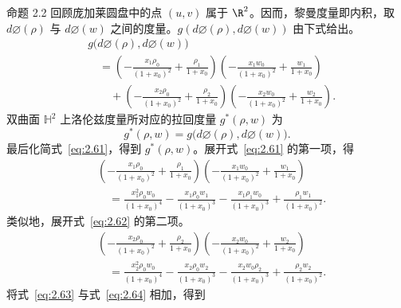 \begin{statement}{命题 2.2}{}
回顾庞加莱圆盘中的点 $(u,v)$ 属于 $\R^2$。因而，黎曼度量即内积，取 $d\varnothing(\rho)$ 与 $d\varnothing(w)$ 之间的度量。$g(d\varnothing(\rho),d\varnothing(w))$ 由下式给出。
\begin{equation*}
  \begin{aligned}
    &g\bigl(d\varnothing(\rho),d\varnothing(w)\bigr)\\
    &\quad=\left(-\frac{x_1\rho_0}{(1+x_0)^2}+\frac{\rho_1}{1+x_0}\right)
      \left(-\frac{x_1w_0}{(1+x_0)^2}+\frac{w_1}{1+x_0}\right)\\
    &\qquad+\left(-\frac{x_2\rho_0}{(1+x_0)^2}+\frac{\rho_2}{1+x_0}\right)
      \left(-\frac{x_2w_0}{(1+x_0)^2}+\frac{w_2}{1+x_0}\right).
  \end{aligned}
  \tag{2.61}\label{eq:2.61}
\end{equation*}
双曲面 $\mathbb H^2$ 上洛伦兹度量所对应的拉回度量 $g^*(\rho,w)$ 为
\begin{equation*}
  g^*(\rho,w)=g\bigl(d\varnothing(\rho),d\varnothing(w)\bigr).
  \tag{2.62}\label{eq:2.62}
\end{equation*}
最后化简式~\eqref{eq:2.61}，得到 $g^*(\rho,w)$。展开式~\eqref{eq:2.61} 的第一项，得
\begin{equation*}
  \begin{aligned}
    &\left(-\frac{x_1\rho_0}{(1+x_0)^2}+\frac{\rho_1}{1+x_0}\right)
     \left(-\frac{x_1w_0}{(1+x_0)^2}+\frac{w_1}{1+x_0}\right)\\
    &\quad=\frac{x_1^2\rho_0w_0}{(1+x_0)^4}
      -\frac{x_1\rho_0w_1}{(1+x_0)^3}
      -\frac{x_1\rho_1w_0}{(1+x_0)^3}
      +\frac{\rho_1w_1}{(1+x_0)^2}.
  \end{aligned}
  \tag{2.63}\label{eq:2.63}
\end{equation*}
类似地，展开式~\eqref{eq:2.62} 的第二项。
\begin{equation*}
  \begin{aligned}
    &\left(-\frac{x_2\rho_0}{(1+x_0)^2}+\frac{\rho_2}{1+x_0}\right)
     \left(-\frac{x_2w_0}{(1+x_0)^2}+\frac{w_2}{1+x_0}\right)\\
    &\quad=\frac{x_2^2\rho_0w_0}{(1+x_0)^4}
      -\frac{x_2\rho_0w_2}{(1+x_0)^3}
      -\frac{x_2w_0\rho_2}{(1+x_0)^3}
      +\frac{\rho_2w_2}{(1+x_0)^2}.
  \end{aligned}
  \tag{2.64}\label{eq:2.64}
\end{equation*}
将式~\eqref{eq:2.63} 与式~\eqref{eq:2.64} 相加，得到
\begin{equation*}

\end{equation*}
\end{statement}
